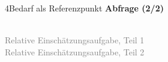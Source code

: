 \documentclass[xcolor=table,9pt,aspectratio=169]{beamer}
\begin{document}
\begin{frame}{\vspace*{10mm}4\hspace*{1em}Bedarf als Referenzpunkt}
\textbf{Abfrage (2/2)}\\
\begin{multicols}{2}
   \begin{center}
      \\
      \textcolor{gray}{Relative Einschätzungsaufgabe, Teil 1}
      \\
      \textcolor{gray}{Relative Einschätzungsaufgabe, Teil 2}
   \end{center}
\end{multicols}
\end{frame}
\end{document}
